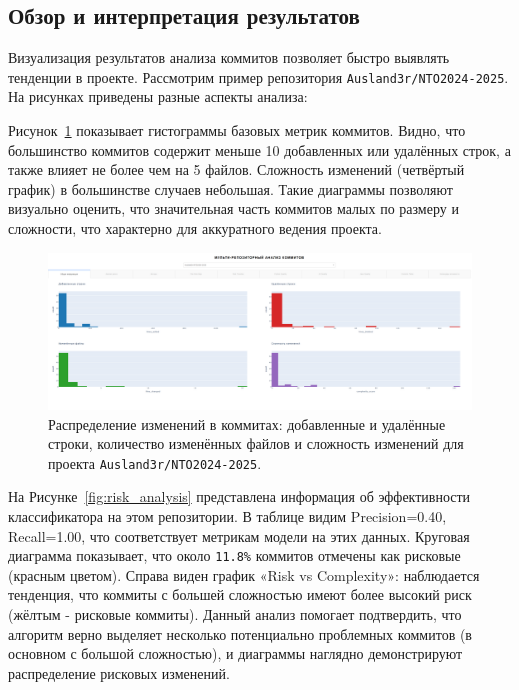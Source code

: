 \subsection{Обзор и интерпретация результатов}
Визуализация результатов анализа коммитов позволяет быстро выявлять тенденции в проекте. Рассмотрим пример репозитория \texttt{Ausland3r/NTO2024-2025}. На рисунках приведены разные аспекты анализа:

Рисунок~\ref{fig:commit_stats} показывает гистограммы базовых метрик коммитов. Видно, что большинство коммитов содержит меньше 10 добавленных или удалённых строк, а также влияет не более чем на 5 файлов. Сложность изменений (четвёртый график) в большинстве случаев небольшая. Такие диаграммы позволяют визуально оценить, что значительная часть коммитов малых по размеру и сложности, что характерно для аккуратного ведения проекта. 

 \begin{figure}[H]
	\centering
	\includegraphics[width=\textwidth]{my_folder/images/first_page.png}
	\caption{Распределение изменений в коммитах: добавленные и удалённые строки, количество изменённых файлов и сложность изменений для проекта \texttt{Ausland3r/NTO2024-2025}.}
	\label{fig:commit_stats}
\end{figure}
На Рисунке~\ref{fig:risk_analysis} представлена информация об эффективности классификатора на этом репозитории. В таблице видим Precision=0.40, Recall=1.00, что соответствует метрикам модели на этих данных. Круговая диаграмма показывает, что около \verb|11.8%| коммитов отмечены как рисковые (красным цветом). Справа виден график «Risk vs Complexity»: наблюдается тенденция, что коммиты с большей сложностью имеют более высокий риск (жёлтым - рисковые коммиты). Данный анализ помогает подтвердить, что алгоритм верно выделяет несколько потенциально проблемных коммитов (в основном с большой сложностью), и диаграммы наглядно демонстрируют распределение рисковых изменений.

